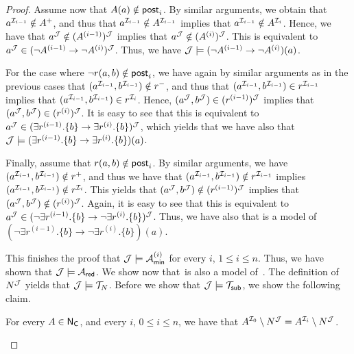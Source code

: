 \begin{proof}
    Assume now that $A(a)\notin\mathsf{post}_i$.  By similar arguments, we obtain that
    $a^{\mathcal{I}_{i-1}}\notin A^+$, and thus that
    $a^{\mathcal{I}_{i-1}}\notin A^{\mathcal{I}_{i-1}}$ implies that
    $a^{\mathcal{I}_{i-1}}\notin A^{\mathcal{I}_i}$.  Hence, we have that
    $a^\mathcal{J}\notin(A^{(i-1)})^\mathcal{J}$ implies that
    $a^\mathcal{J}\notin(A^{(i)})^\mathcal{J}$.  This is equivalent to
    $a^\mathcal{J}\in(\lnot A^{(i-1)}\to\lnot A^{(i)})^\mathcal{J}$.  Thus, we have
    $\mathcal{J}\models(\lnot A^{(i-1)}\to\lnot A^{(i)})(a)$.

    For the case where $\lnot r(a,b)\notin\mathsf{post}_i$, we have again by similar
    arguments as in the previous cases that
    $(a^{\mathcal{I}_{i-1}},b^{\mathcal{I}_{i-1}})\notin r^-$, and thus that
    $(a^{\mathcal{I}_{i-1}},b^{\mathcal{I}_{i-1}})\in r^{\mathcal{I}_{i-1}}$ implies that
    $(a^{\mathcal{I}_{i-1}},b^{\mathcal{I}_{i-1}})\in r^{\mathcal{I}_i}$.  Hence,
    $(a^\mathcal{J},b^\mathcal{J})\in(r^{(i-1)})^\mathcal{J}$ implies that
    $(a^\mathcal{J},b^\mathcal{J})\in(r^{(i)})^\mathcal{J}$.  It is easy to see that this is
    equivalent to
    $a^\mathcal{J}\in(\exists r^{(i-1)}.\{b\}\to\exists r^{(i)}.\{b\})^\mathcal{J}$, which
    yields that we have also that
    $\mathcal{J}\models(\exists r^{(i-1)}.\{b\}\to\exists r^{(i)}.\{b\})(a)$.

    Finally, assume that $r(a,b)\notin\mathsf{post}_i$.  By similar arguments, we have
    $(a^{\mathcal{I}_{i-1}},b^{\mathcal{I}_{i-1}})\notin r^+$, and thus we have that
    $(a^{\mathcal{I}_{i-1}},b^{\mathcal{I}_{i-1}})\notin r^{\mathcal{I}_{i-1}}$ implies
    $(a^{\mathcal{I}_{i-1}},b^{\mathcal{I}_{i-1}})\notin r^{\mathcal{I}_i}$.  This yields that
    $(a^\mathcal{J},b^\mathcal{J})\notin(r^{(i-1)})^\mathcal{J}$ implies that
    $(a^\mathcal{J},b^\mathcal{J})\notin(r^{(i)})^\mathcal{J}$.  Again, it is easy to see that this
    is equivalent to
    $a^\mathcal{J}\in(\lnot\exists r^{(i-1)}.\{b\}\to\lnot\exists r^{(i)}.\{b\})^\mathcal{J}$.
    Thus, we have also that \Jmc is a model of
    $(\lnot\exists r^{(i-1)}.\{b\}\to\lnot\exists r^{(i)}.\{b\})(a)$.

    This finishes the proof that $\mathcal{J}\models\mathcal{A}_\mathsf{min}^{(i)}$ for every $i$,
    $1\le i\le n$.  Thus, we have shown that $\mathcal{J}\models\mathcal{A}_\mathsf{red}$.
    We show now that~\Jmc is also a model of~\Tred.
    The definition of $N^\mathcal{J}$ yields that $\mathcal{J}\models\mathcal{T}_N$.  Before we show
    that $\mathcal{J}\models\mathcal{T}_\mathsf{sub}$, we show the following claim.

    \begin{claim}\label{claim:anon-dont-change-concepts}
        For every $A\in\mathsf{N_C}$, and every $i$, $0\le i\le n$, we have that
        $A^{\mathcal{I}_0}\setminus N^\mathcal{J}=A^{\mathcal{I}_i}\setminus N^\mathcal{J}$.
    \end{claim}


\end{proof}
